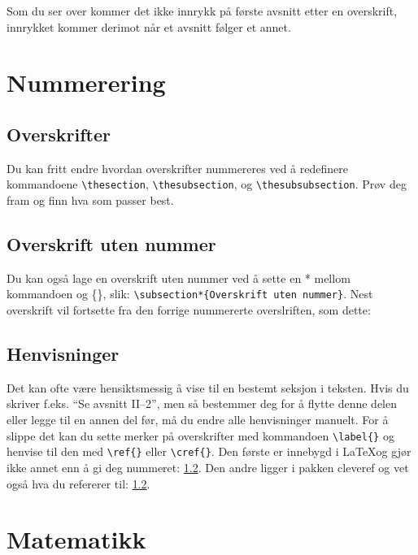 Som du ser over kommer det ikke innrykk på første avsnitt etter en overskrift, innrykket
kommer derimot når et avsnitt følger et annet.

\section{Nummerering}

\lstset{language=tex} %

\subsection{Overskrifter}

Du kan fritt endre hvordan overskrifter nummereres ved å redefinere kommandoene
\lstinline$\thesection$, \lstinline$\thesubsection$, og \lstinline$\thesubsubsection$.
Prøv deg fram og finn hva som passer best.

\subsection*{Overskrift uten nummer}
Du kan også lage en overskrift uten nummer ved å sette en * mellom kommandoen og \{\}, slik:
\lstinline$\subsection*{Overskrift uten nummer}$.
Nest overskrift vil fortsette fra den forrige nummererte overslriften, som dette:

\subsection{Henvisninger}\label{ov:henvisninger}
Det kan ofte være hensiktsmessig å vise til en bestemt seksjon i teksten. Hvis du skriver
f.eks. ``Se avsnitt II--2'', men så bestemmer deg for å flytte denne delen eller legge til
en annen del før, må du endre alle henvisninger manuelt.
For å slippe det kan du sette merker på overskrifter med kommandoen \lstinline$\label{}$
og henvise til den med \lstinline$\ref{}$ eller \lstinline$\cref{}$. Den første er
innebygd i \LaTeX og gjør ikke annet enn å gi deg nummeret: \ref{ov:henvisninger}.
Den andre ligger i pakken cleveref og vet også hva du refererer til: \cref{ov:henvisninger}.


\section{Matematikk}

